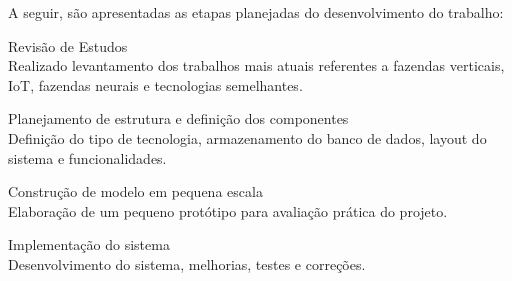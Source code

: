 A seguir, são apresentadas as etapas planejadas do desenvolvimento do trabalho:

Revisão de Estudos \\
Realizado levantamento dos trabalhos mais atuais referentes a fazendas verticais, IoT, fazendas neurais e tecnologias semelhantes.

Planejamento de estrutura e definição dos componentes \\
Definição do tipo de tecnologia, armazenamento do banco de dados, layout do sistema e funcionalidades.

Construção de modelo em pequena escala \\
Elaboração de um pequeno protótipo para avaliação prática do projeto.

Implementação do sistema \\
Desenvolvimento do sistema, melhorias, testes e correções.